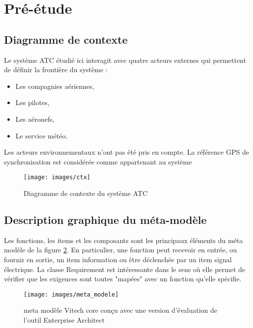 \section{Pré-étude}


\subsection{ Diagramme de contexte }

Le système ATC étudié ici interagit avec quatre acteurs externes qui permettent de définir la frontière du système : 

\begin{itemize}
	\item Les compagnies aériennes,
	\item Les pilotes,
	\item Les aéronefs,
	\item Le service météo. 
\end{itemize}

Les acteurs environnementaux n'ont pas été pris en compte. La référence GPS de synchronisation est considérée comme appartenant au système

	\begin{figure}[H]
	\begin{center}	
		\texttt{[image: images/ctx]}
		\caption{Diagramme de contexte du système ATC}
		\label{ctx}
	\end{center}
\end{figure}

\subsection{ Description graphique du méta-modèle }

Les fonctions, les items et les composants sont les principaux éléments du méta modèle de la  figure \ref{meta}. En particulier, une fonction peut recevoir en entrée, ou fournir en sortie, un item information ou être déclenchée par un item signal électrique. La classe Requirement est intéressante dans le sens où elle permet de vérifier que les exigences sont toutes "mapées" avec un fonction qu'elle spécifie. 

\begin{figure}[H]
	\begin{center}	
\texttt{[image: images/meta\_modele]}
\caption{meta modèle Vitech core conçu avec une version d'évaluation de l'outil Enterprise Architect}
\label{meta}
	\end{center}
\end{figure}


